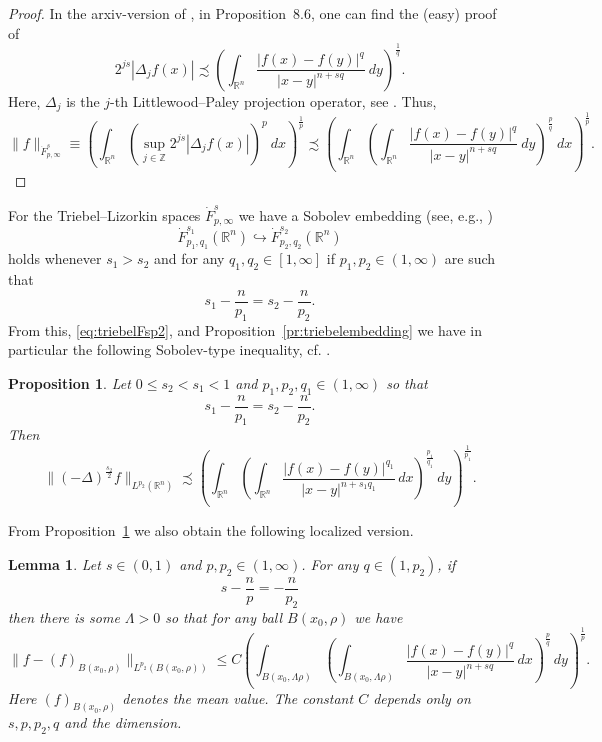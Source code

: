 \documentclass[12pt]{amsart}
\newtheorem{lemma}[theorem]{Lemma}
\newtheorem{proposition}[theorem]{Proposition}
\theoremstyle{definition}
\newcommand{\R}{\mathbb{R}}
\newcommand{\Z}{\mathbb{Z}}
\newcommand{\brac}[1]{\left (#1 \right )}
\numberwithin{theorem}{section} \numberwithin{equation}{section}
\newcommand{\lap}{\Delta }
\newcommand{\aleq}{\precsim}
\newcommand{\laps}[1]{(-\lap)^{\frac{#1}{2}}}
\begin{document}
\begin{proof}
In the arxiv-version of \cite{Schikorra-CPDE}, in Proposition~8.6, one can find the (easy) proof of
\[
 2^{js} |\lap_j f(x)| \aleq \brac{\int_{\R^n} \frac{|f(x)-f(y)|^q}{|x-y|^{n+sq}}\ dy}^{\frac{1}{q}}.
\]
Here, $\lap_j$ is the $j$-th Littlewood--Paley projection operator, see \cite{GrafakosCF,GrafakosMF}. Thus,
\[
 \|f\|_{\dot{F}^s_{p,\infty}} \equiv \brac{\int_{\R^n} \brac{\sup_{j \in \Z} 2^{js} |\lap_jf(x)|}^p\ dx}^{\frac{1}{p}} \aleq 
 \brac{\int_{\R^n}\brac{\int_{\R^n} \frac{|f(x)-f(y)|^q}{|x-y|^{n+sq}}\ dy}^{\frac{p}{q}}\ dx}^{\frac{1}{p}}.
\]
\end{proof}
% 
For the Triebel--Lizorkin spaces $\dot{F}^s_{p,\infty}$ we have a Sobolev embedding (see, e.g., \cite[Theorem~2.7.1 (ii)]{Triebel1983}) \[\dot{F}^{s_1}_{p_1,q_1}(\R^n) \hookrightarrow  \dot{F}^{s_2}_{p_2,q_2}(\R^n)\] holds whenever $s_1 > s_2$ and for any $q_1,q_2 \in [1,\infty]$ if $p_1, p_2 \in (1,\infty)$ are such that \[s_1 - \frac{n}{p_1} = s_2 - \frac{n}{p_2}.\] From this, \eqref{eq:triebelFsp2}, and Proposition~\ref{pr:triebelembedding} we have in particular the following Sobolev-type inequality, cf. \cite[Theorem 1.6]{Schikorra-CPDE}.
\begin{proposition}\label{pr:sobolevin}
Let $0 \leq s_2 < s_1 < 1$ and $p_1,p_2,q_1\in (1,\infty)$ so that
\[
 s_1 - \frac{n}{p_1} = s_2 - \frac{n}{p_2}.
\]
Then
 \begin{equation}\label{eq:sobolev}
  \|\laps{s_2} f \|_{L^{p_2}(\R^n)} \aleq \brac{\int_{\R^n}\brac{\int_{\R^n} \frac{|f(x)-f(y)|^{q_1}}{|x-y|^{n+s_1 q_1}}\, dx}^{\frac{p_1}{q_1}}\, dy}^{\frac{1}{p_1}}.
  \end{equation}
\end{proposition}
%   
From Proposition~\ref{pr:sobolevin} we also obtain the following localized version.
% 
\begin{lemma}\label{la:locsobolev}
Let $s \in (0,1)$ and $p,p_2 \in (1,\infty)$. For any $q \in (1,p_2)$, if
\begin{equation}\label{eq:lsp2def}
 s - \frac{n}{p} = -\frac{n}{p_2}
\end{equation}
then there is some $\Lambda > 0$ so that for any ball $B(x_0,\rho)$ we have
\[
  \|f - (f)_{B(x_0,\rho)}\|_{L^{p_2}(B(x_0,\rho))} \leq C \brac{\int_{B(x_0,\Lambda \rho)}\brac{\int_{B(x_0,\Lambda \rho)} \frac{|f(x)-f(y)|^{q}}{|x-y|^{n+s q}}\, dx}^{\frac{p}{q}}\, dy}^{\frac{1}{p}}.
\]
Here $(f)_{B(x_0,\rho)}$ denotes the mean value. The constant $C$ depends only on $s,p,p_2,q$ and the dimension.
\end{lemma}
\end{document}
